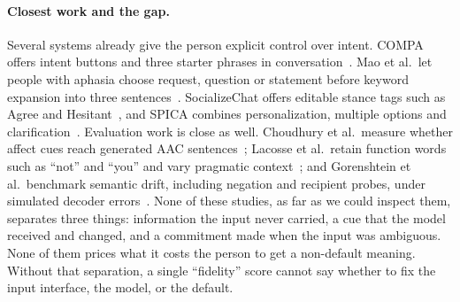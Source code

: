 \documentclass{ceurart}
\newcommand{\say}[1]{``#1''}
\begin{document}
\paragraph{Closest work and the gap.}
Several systems already give the person explicit control over intent.
COMPA offers intent buttons and three starter phrases in conversation~\cite{valencia2024compa}.
Mao et al.\ let people with aphasia choose request, question or statement before keyword expansion into three sentences~\cite{mao2025designprobes}.
SocializeChat offers editable stance tags such as Agree and Hesitant~\cite{xiang2025socializechat}, and SPICA combines personalization, multiple options and clarification~\cite{pal2026spica}.
Evaluation work is close as well.
Choudhury et al.\ measure whether affect cues reach generated AAC sentences~\cite{choudhury2025alignment}; Lacosse et al.\ retain function words such as \say{not} and \say{you} and vary pragmatic context~\cite{lacosse2026cognitivesteering}; and Gorenshtein et al.\ benchmark semantic drift, including negation and recipient probes, under simulated decoder errors~\cite{gorenshtein2026intentdrift}.
None of these studies, as far as we could inspect them, separates three things: information the input never carried, a cue that the model received and changed, and a commitment made when the input was ambiguous.
None of them prices what it costs the person to get a non-default meaning.
Without that separation, a single ``fidelity'' score cannot say whether to fix the input interface, the model, or the default.
\end{document}
